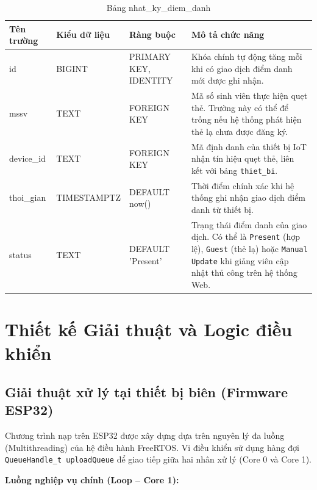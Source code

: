 \documentclass[12pt,a4paper]{report}
\begin{document}
\begin{table}[H]
\centering
\caption{Bảng nhat\_ky\_diem\_danh}
\begin{tabularx}{\textwidth}{|l|l|l|X|}
\hline
\textbf{Tên trường} & \textbf{Kiểu dữ liệu} & \textbf{Ràng buộc} & \textbf{Mô tả chức năng} \\
\hline
id & BIGINT & PRIMARY KEY, IDENTITY & Khóa chính tự động tăng mỗi khi có giao dịch điểm danh mới được ghi nhận. \\
\hline
mssv & TEXT & FOREIGN KEY & Mã số sinh viên thực hiện quẹt thẻ. Trường này có thể để trống nếu hệ thống phát hiện thẻ lạ chưa được đăng ký. \\
\hline
device\_id & TEXT & FOREIGN KEY & Mã định danh của thiết bị IoT nhận tín hiệu quẹt thẻ, liên kết với bảng \texttt{thiet\_bi}. \\
\hline
thoi\_gian & TIMESTAMPTZ & DEFAULT now() & Thời điểm chính xác khi hệ thống ghi nhận giao dịch điểm danh từ thiết bị. \\
\hline
status & TEXT & DEFAULT 'Present' & Trạng thái điểm danh của giao dịch. Có thể là \texttt{Present} (hợp lệ), \texttt{Guest} (thẻ lạ) hoặc \texttt{Manual Update} khi giảng viên cập nhật thủ công trên hệ thống Web. \\
\hline
\end{tabularx}
\label{bang:nhatky_diemdanh}
\end{table}

\section{Thiết kế Giải thuật và Logic điều khiển}

\subsection{Giải thuật xử lý tại thiết bị biên (Firmware ESP32)}

Chương trình nạp trên ESP32 được xây dựng dựa trên nguyên lý đa luồng 
(Multithreading) của hệ điều hành FreeRTOS. Vi điều khiển sử dụng hàng đợi 
\texttt{QueueHandle\_t uploadQueue} để giao tiếp giữa hai nhân xử lý (Core 0 và Core 1).

\textbf{Luồng nghiệp vụ chính (Loop -- Core 1):}
\end{document}
